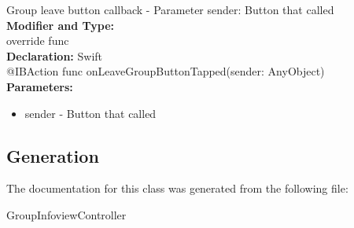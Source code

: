 Group leave button callback - Parameter sender: Button that called\\

\textbf{Modifier and Type:}\\
\tab override func\\


\textbf{Declaration:}
\tab 
Swift\\

@IBAction func onLeaveGroupButtonTapped(sender: AnyObject)\\

\textbf{Parameters:}
\begin{itemize}
\item sender - Button that called
\end{itemize}


\subsection{Generation}
The documentation for this class was generated from the following file\-:
\begin{DoxyCompactItemize}
\item GroupInfoviewController
\end{DoxyCompactItemize} 










